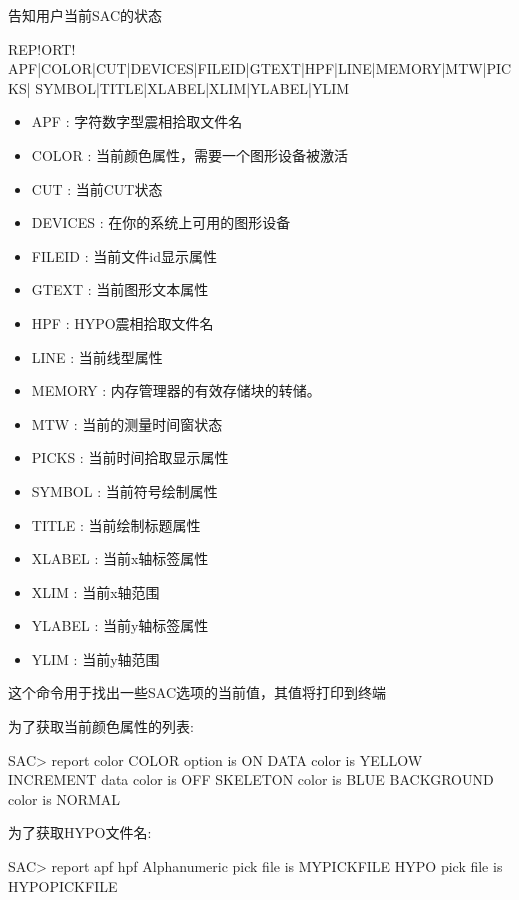 \label{cmd:report}

告知用户当前SAC的状态

\begin{SACSTX}
REP!ORT! APF|COLOR|CUT|DEVICES|FILEID|GTEXT|HPF|LINE|MEMORY|MTW|PICKS|
    SYMBOL|TITLE|XLABEL|XLIM|YLABEL|YLIM  
\end{SACSTX}

\begin{itemize}
\item APF : 字符数字型震相拾取文件名 
\item COLOR : 当前颜色属性，需要一个图形设备被激活 
\item CUT : 当前CUT状态 
\item DEVICES : 在你的系统上可用的图形设备 
\item FILEID : 当前文件id显示属性 
\item GTEXT : 当前图形文本属性 
\item HPF : HYPO震相拾取文件名 
\item LINE : 当前线型属性 
\item MEMORY : 内存管理器的有效存储块的转储。 
\item MTW : 当前的测量时间窗状态 
\item PICKS : 当前时间拾取显示属性 
\item SYMBOL : 当前符号绘制属性 
\item TITLE : 当前绘制标题属性 
\item XLABEL : 当前x轴标签属性 
\item XLIM : 当前x轴范围 
\item YLABEL : 当前y轴标签属性 
\item YLIM : 当前y轴范围 
\end{itemize} 

这个命令用于找出一些SAC选项的当前值，其值将打印到终端

为了获取当前颜色属性的列表:
\begin{SACCode}
SAC> report color
 COLOR option is ON
 DATA color is YELLOW
 INCREMENT data color is OFF
 SKELETON color is BLUE
 BACKGROUND color is NORMAL
\end{SACCode}

为了获取HYPO文件名:
\begin{SACCode}
SAC> report apf hpf
 Alphanumeric pick file is MYPICKFILE
 HYPO pick file is HYPOPICKFILE
\end{SACCode}
